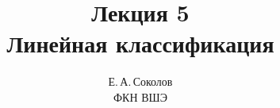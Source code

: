 \documentclass[12pt,fleqn]{article}
\begin{document}
\title{Лекция 5\\Линейная классификация}
\author{Е.\,А.\,Соколов\\ФКН ВШЭ}
\maketitle






\end{document}
